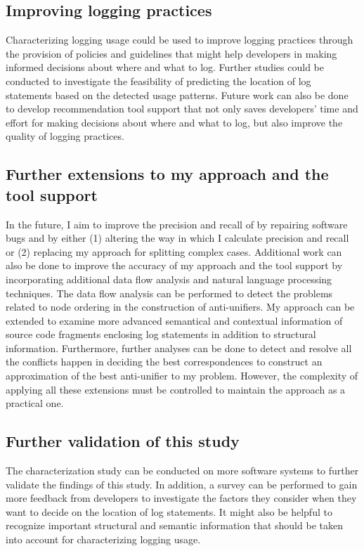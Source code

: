 \subsection{Improving logging practices}
Characterizing logging usage could be used to improve logging practices through the provision of policies and guidelines that might help developers in making informed decisions about where and what to log. Further studies could be conducted to investigate the feasibility of predicting the location of log statements based on the detected usage patterns. Future work can also be done to develop recommendation tool support that not only saves developers' time and effort for making decisions about where and what to log, but also improve the quality of logging practices.
\subsection{Further extensions to my approach and the tool support}
In the future, I aim to improve the precision and recall of  by repairing software bugs and by either (1) altering the way in which I calculate precision and recall or (2) replacing my approach for splitting complex cases. Additional work can also be done to improve the accuracy of my approach and the tool support by incorporating additional data flow analysis and natural language processing techniques. The data flow analysis can be performed to detect the problems related to node ordering in the  construction of anti-unifiers. My approach can be extended to examine more advanced semantical and contextual information of source code fragments enclosing log statements in addition to structural information. Furthermore, further analyses can be done to detect and resolve all the conflicts happen in deciding the best correspondences to construct an approximation of the best anti-unifier to my problem. However, the complexity of applying all these extensions must be controlled to maintain the approach as a practical one.

\subsection{Further validation of this study}
The characterization study can be conducted on more software systems to further validate the findings of this study. In addition, a survey can be performed to gain more feedback from developers to investigate the factors they consider when they want to decide on the location of log statements. It might also be helpful to recognize important structural and semantic information that should be taken into account for characterizing logging usage.

